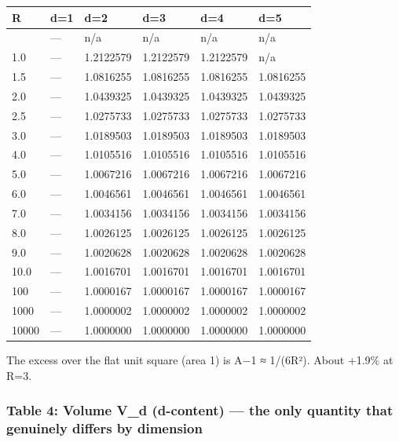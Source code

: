 \documentclass[
]{ltjsarticle}
\newcounter{none} %
\begin{document}
{\def\LTcaptype{none} %
\begin{longtable}[]{@{}llllll@{}}
\toprule\noalign{}
R & d=1 & d=2 & d=3 & d=4 & d=5 \\
\midrule\noalign{}
\endhead
\bottomrule\noalign{}
\endlastfoot
0.5 & --- & n/a & n/a & n/a & n/a \\
1.0 & --- & 1.2122579 & 1.2122579 & 1.2122579 & n/a \\
1.5 & --- & 1.0816255 & 1.0816255 & 1.0816255 & 1.0816255 \\
2.0 & --- & 1.0439325 & 1.0439325 & 1.0439325 & 1.0439325 \\
2.5 & --- & 1.0275733 & 1.0275733 & 1.0275733 & 1.0275733 \\
3.0 & --- & 1.0189503 & 1.0189503 & 1.0189503 & 1.0189503 \\
4.0 & --- & 1.0105516 & 1.0105516 & 1.0105516 & 1.0105516 \\
5.0 & --- & 1.0067216 & 1.0067216 & 1.0067216 & 1.0067216 \\
6.0 & --- & 1.0046561 & 1.0046561 & 1.0046561 & 1.0046561 \\
7.0 & --- & 1.0034156 & 1.0034156 & 1.0034156 & 1.0034156 \\
8.0 & --- & 1.0026125 & 1.0026125 & 1.0026125 & 1.0026125 \\
9.0 & --- & 1.0020628 & 1.0020628 & 1.0020628 & 1.0020628 \\
10.0 & --- & 1.0016701 & 1.0016701 & 1.0016701 & 1.0016701 \\
100 & --- & 1.0000167 & 1.0000167 & 1.0000167 & 1.0000167 \\
1000 & --- & 1.0000002 & 1.0000002 & 1.0000002 & 1.0000002 \\
10000 & --- & 1.0000000 & 1.0000000 & 1.0000000 & 1.0000000 \\
\end{longtable}
}

The excess over the flat unit square (area 1) is A−1 ≈ 1/(6R²). About
+1.9\% at R=3.

\subsubsection{Table 4: Volume V\_d (d-content) --- the only quantity
that genuinely differs by
dimension}\label{table-4-volume-v_d-d-content-the-only-quantity-that-genuinely-differs-by-dimension}
\end{document}
